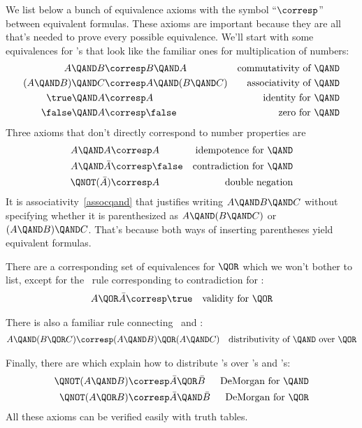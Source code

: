 We list below a bunch of equivalence axioms with the symbol
``$\corresp$'' between equivalent formulas.  These axioms are
important because they are all that's needed to prove every possible
equivalence.  We'll start with some equivalences for \QAND's that look
like the familiar ones for multiplication of numbers:
\begin{align}
A \QAND B           &\corresp B \QAND A
         & \text{commutativity of \QAND}\label{commutqand}\\
(A \QAND B)\QAND C  & \corresp A \QAND (B \QAND C)
         & \text{associativity of \QAND}\label{assocqand}\\
\true \QAND A           &\corresp A
         & \text{identity for \QAND}\\
\false \QAND A           &\corresp \false
         & \text{zero for \QAND}
\end{align}
Three axioms that don't directly correspond to number properties are
\begin{align}
A \QAND A       &\corresp A
         & \text{idempotence for \QAND}\\
A \QAND \bar{A} & \corresp \false
         & \text{contradiction for \QAND}\\
\QNOT(\bar{A})  & \corresp A
         & \text{double negation}\\
\end{align}
It is associativity~\eqref{assocqand} that justifies writing $A \QAND
B \QAND C$ without specifying whether it is parenthesized as $A \QAND
(B \QAND C)$ or $(A \QAND B) \QAND C$.  That's because both ways of
inserting parentheses yield equivalent formulas.

There are a corresponding set of equivalences for $\QOR$ which we
won't bother to list, except for the \QOR\ rule corresponding to
contradiction for \QAND:
\begin{align}
A \QOR \bar{A} & \corresp \true
         & \text{validity for \QOR}\\
\end{align}

There is also a familiar rule connecting \QAND\ and \QOR:
\begin{align}\label{qand-distributivity}
A \QAND (B \QOR C) & \corresp (A \QAND B) \QOR (A \QAND C)
       & \text{distributivity of \QAND\ over \QOR}
\end{align}

Finally, there are  which explain how to
distribute \QNOT's over \QAND's and \QOR's:
\begin{align}\label{demorgan}
\QNOT(A \QAND B) &\corresp \bar{A} \QOR \bar{B} & \text{DeMorgan for \QAND} \\
\QNOT(A \QOR B) &\corresp \bar{A} \QAND \bar{B} & \text{DeMorgan for \QOR}\label{DeMQOR} 
\end{align}
All these axioms can be verified easily with truth tables.

